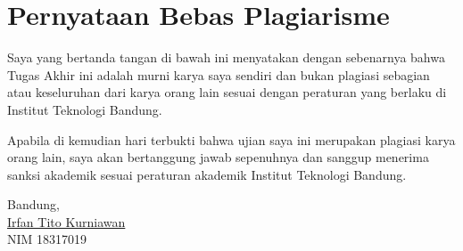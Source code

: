 \chapter*{Pernyataan Bebas Plagiarisme}

Saya yang bertanda tangan di bawah ini menyatakan dengan sebenarnya bahwa Tugas Akhir ini adalah murni karya saya sendiri dan bukan plagiasi sebagian atau keseluruhan dari karya orang lain sesuai dengan peraturan yang berlaku di Institut Teknologi Bandung.

Apabila di kemudian hari terbukti bahwa ujian saya ini merupakan plagiasi karya orang lain, saya akan bertanggung jawab sepenuhnya dan sanggup menerima sanksi akademik sesuai peraturan akademik Institut Teknologi Bandung.
\\[\baselineskip]

\hfill
\parbox{5.5cm}{
	Bandung, \thedate \\[2\baselineskip]
	\underline{Irfan Tito Kurniawan} \\
	NIM 18317019
}


